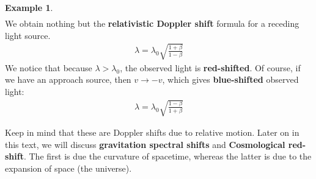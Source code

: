 \documentclass{book}
\theoremstyle{definition}
\newtheorem{exmp}{Example}[section]
\begin{document}
\begin{exmp}
\begin{align*}
	\end{align*}
	We obtain nothing but the \textbf{relativistic Doppler shift} formula for a receding light source. 
	\begin{align*}
	\boxed{\lambda = \lambda_0 \sqrt{\frac{1+\beta}{1-\beta}}}
	\end{align*}
	We notice that because $\lambda > \lambda_0$, the observed light is \textbf{red-shifted}. Of course, if we have an approach source, then $v \rightarrow -v$, which gives \textbf{blue-shifted} observed light:
	\begin{align*}
	\boxed{\lambda = \lambda_0\sqrt{\frac{1-\beta}{1+\beta}}}
	\end{align*}
\end{exmp}

Keep in mind that these are Doppler shifts due to relative motion. Later on in this text, we will discuss \textbf{gravitation spectral shifts} and \textbf{Cosmological red-shift}. The first is due the curvature of spacetime, whereas the latter is due to the expansion of space (the universe).\\
\end{document}
